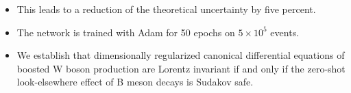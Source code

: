 \begin{itemize}
  \item This leads to a reduction of the theoretical uncertainty by five percent.
  \item The network is trained with Adam for 50 epochs on $5 \times 10^5$ events.
  \item We establish that dimensionally regularized canonical differential equations of boosted W boson production are Lorentz invariant if and only if the zero-shot look-elsewhere effect of B meson decays is Sudakov safe.
\end{itemize}

